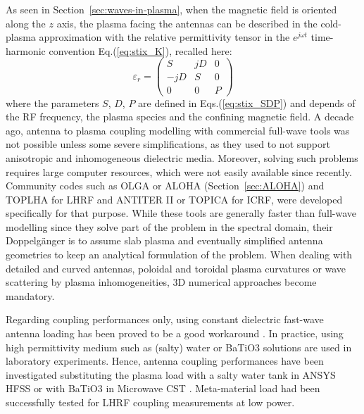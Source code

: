 As seen in Section~\ref{sec:waves-in-plasma}, when the magnetic field is oriented along the $z$ axis, the plasma facing the antennas can be described in the cold-plasma approximation with the relative permittivity tensor in the $e^{j\omega t}$ time-harmonic convention Eq.(\ref{eq:stix_K}), recalled here:
\begin{equation}
\varepsilon_r 
=
\left(
\begin{array}{ccc}
S & jD & 0 \\
-jD & S & 0 \\
0 & 0 & P
\end{array}
\right)
\label{eq:stix_tensor}
\end{equation}
where the parameters $S$, $D$, $P$ are defined in Eqs.(\ref{eq:stix_SDP}) and depends of the RF frequency, the plasma species and the confining magnetic field. 
A decade ago, antenna to plasma coupling modelling with commercial full-wave tools was not possible unless some severe simplifications, as they used to not support anisotropic and inhomogeneous dielectric media. Moreover, solving such problems requires large computer resources, which were not easily available since recently. Community codes such as {OLGA} \cite{preinhaelter2017} or {ALOHA} \cite{hillairet2010} (Section~\ref{sec:ALOHA}) and {TOPLHA} \cite{milanesio2012} for LHRF and {ANTITER II} \cite{messiaen2011} or {TOPICA} \cite{lancellotti2006} for {ICRF}, were developed specifically for that purpose. While these tools are generally faster than full-wave modelling since they solve part of the problem in the spectral domain, their Doppelgänger is to assume slab plasma and eventually simplified antenna geometries to keep an analytical formulation of the problem. When dealing with detailed and curved antennas, poloidal and toroidal plasma curvatures or wave scattering by plasma inhomogeneities, 3D numerical approaches become mandatory. 

Regarding coupling performances only, using constant dielectric fast-wave antenna loading has been proved to be a good workaround \cite{messiaen2011-1}. In practice, using high permittivity medium such as (salty) water\cite{messiaen2005} or BaTiO3 solutions\cite{helou2018} are used in laboratory experiments. Hence,  antenna coupling performances have been investigated substituting the plasma load  with a salty water tank in ANSYS HFSS \cite{ravera2012, qin2015} or with BaTiO3 in Microwave CST \cite{bottollier-curtet2011}. Meta-material load had been successfully tested\cite{rustomji2018} for LHRF coupling measurements at low power. 


